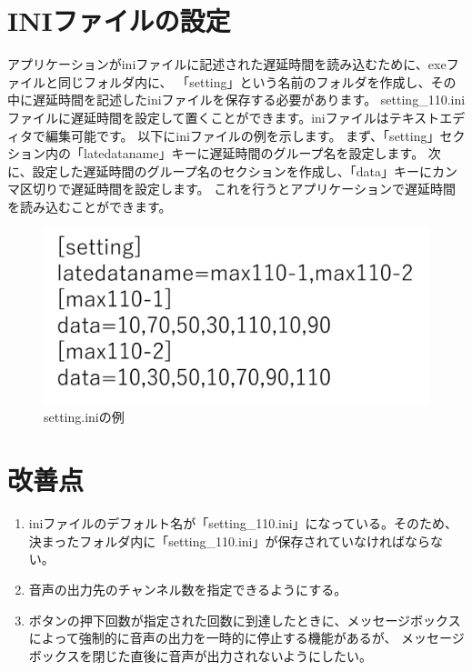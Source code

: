 \documentclass{article} %
\begin{document}
\section{INIファイルの設定}
アプリケーションがiniファイルに記述された遅延時間を読み込むために、exeファイルと同じフォルダ内に、
「setting」という名前のフォルダを作成し、その中に遅延時間を記述したiniファイルを保存する必要があります。
setting\_110.iniファイルに遅延時間を設定して置くことができます。iniファイルはテキストエディタで編集可能です。
以下にiniファイルの例を示します。
まず、「setting」セクション内の「latedataname」キーに遅延時間のグループ名を設定します。
次に、設定した遅延時間のグループ名のセクションを作成し、「data」キーにカンマ区切りで遅延時間を設定します。
これを行うとアプリケーションで遅延時間を読み込むことができます。
\begin{figure}[tbp]
  \centering
  \includegraphics[scale=0.3]{setting-ini.pdf}
  \caption{setting.iniの例}
  \label{fig:ini-file}
\end{figure}

\section{改善点}
\begin{enumerate}
  \item iniファイルのデフォルト名が「setting\_110.ini」になっている。そのため、決まったフォルダ内に「setting\_110.ini」が保存されていなければならない。
  \item 音声の出力先のチャンネル数を指定できるようにする。
  \item ボタンの押下回数が指定された回数に到達したときに、メッセージボックスによって強制的に音声の出力を一時的に停止する機能があるが、
  メッセージボックスを閉じた直後に音声が出力されないようにしたい。
\end{enumerate}
\end{document}
